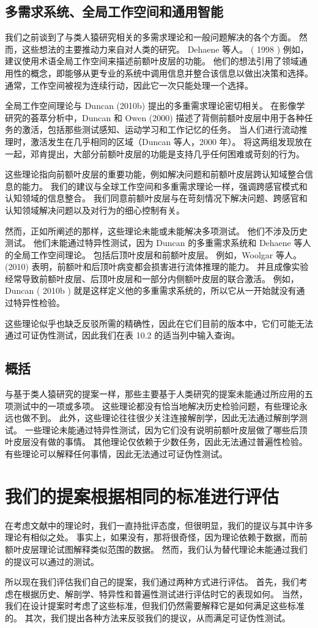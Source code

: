 \subsection{多需求系统、全局工作空间和通用智能}
我们之前谈到了与类人猿研究相关的多需求理论和一般问题解决的各个方面。 然而，这些想法的主要推动力来自对人类的研究。 Dehaene 等人。 ( 1998 ) 例如，建议使用术语全局工作空间来描述前额叶皮层的功能。 他们的想法引用了领域通用性的概念，即能够从更专业的系统中调用信息并整合该信息以做出决策和选择。 通常，工作空间被视为连续行动，因此它一次只能处理一个选择。
\par 
全局工作空间理论与 Duncan (2010b) 提出的多重需求理论密切相关。 在影像学研究的荟萃分析中，Duncan 和 Owen (2000) 描述了背侧前额叶皮层中用于各种任务的激活，包括那些测试感知、运动学习和工作记忆的任务。 当人们进行流动推理时，激活发生在几乎相同的区域（Duncan 等人，2000 年）。 将这两组发现放在一起，邓肯提出，大部分前额叶皮层的功能是支持几乎任何困难或苛刻的行为。
\par 
这些理论指向前额叶皮层的重要功能，例如解决问题和前额叶皮层跨认知域整合信息的能力。 我们的建议与全球工作空间和多重需求理论一样，强调跨感官模式和认知领域的信息整合。 我们同意前额叶皮层与在苛刻情况下解决问题、跨感官和认知领域解决问题以及对行为的细心控制有关。
\par 
然而，正如所阐述的那样，这些理论未能或未能解决多项测试。 他们不涉及历史测试。 他们未能通过特异性测试，因为 Duncan 的多重需求系统和 Dehaene 等人的全局工作空间理论。 包括后顶叶皮层和前额叶皮层。 例如，Woolgar 等人。 (2010) 表明，前额叶和后顶叶病变都会损害进行流体推理的能力。 并且成像实验经常导致前额叶皮层、后顶叶皮层和一部分内侧额叶皮层的联合激活。 例如，Duncan ( 2010b ) 就是这样定义他的多重需求系统的，所以它从一开始就没有通过特异性检验。
\par 
这些理论似乎也缺乏反驳所需的精确性，因此在它们目前的版本中，它们可能无法通过可证伪性测试，因此我们在表 10.2 的适当列中输入查询。
\subsection{概括}
与基于类人猿研究的提案一样，那些主要基于人类研究的提案未能通过所应用的五项测试中的一项或多项。 这些理论都没有恰当地解决历史检验问题，有些理论永远也做不到。 此外，这些理论往往很少关注连接解剖学，因此无法通过解剖学测试。 一些理论未能通过特异性测试，因为它们没有说明前额叶皮层做了哪些后顶叶皮层没有做的事情。 其他理论仅依赖于少数任务，因此无法通过普遍性检验。 有些理论可以解释任何事情，因此无法通过可证伪性测试。
\section{我们的提案根据相同的标准进行评估}
在考虑文献中的理论时，我们一直持批评态度，但很明显，我们的提议与其中许多理论有相似之处。 事实上，如果没有，那将很奇怪，因为理论依赖于数据，而前额叶皮层理论试图解释类似范围的数据。 然而，我们认为替代理论未能通过我们的提议可以通过的测试。
\par 
所以现在我们评估我们自己的提案，我们通过两种方式进行评估。 首先，我们考虑在根据历史、解剖学、特异性和普遍性测试进行评估时它的表现如何。 当然，我们在设计提案时考虑了这些标准，但我们仍然需要解释它是如何满足这些标准的。 其次，我们提出各种方法来反驳我们的提议，从而满足可证伪性测试。
